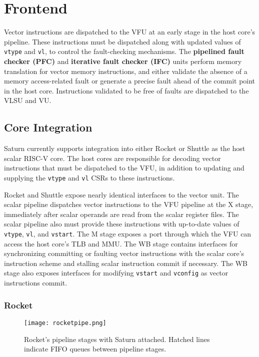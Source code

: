 \newpage
\section{Frontend}
\label{sec:frontend}


Vector instructions are dispatched to the VFU at an early stage in the host core's pipeline.
These instructions must be dispatched along with updated values of \texttt{vtype} and \texttt{vl}, to control the fault-checking mechanisms.
The \textbf{pipelined fault checker (PFC)} and \textbf{iterative fault checker (IFC)} units perform memory translation for vector memory instructions, and either validate the absence of a memory access-related fault or generate a precise fault ahead of the commit point in the host core.
Instructions validated to be free of faults are dispatched to the VLSU and VU.

\subsection{Core Integration}

Saturn currently supports integration into either Rocket or Shuttle as the host scalar RISC-V core.
The host cores are responsible for decoding vector instructions that must be dispatched to the VFU, in addition to updating and supplying the \texttt{vtype} and \texttt{vl} CSRs to these instructions.

Rocket and Shuttle expose nearly identical interfaces to the vector unit.
The scalar pipeline dispatches vector instructions to the VFU pipeline at the X stage, immediately after scalar operands are read from the scalar register files.
The scalar pipeline also must provide these instructions with up-to-date values of \texttt{vtype}, \texttt{vl}, and \texttt{vstart}.
The M stage exposes a port through which the VFU can access the host core's TLB and MMU.
The WB stage contains interfaces for synchronizing committing or faulting vector instructions with the scalar core's instruction scheme and stalling scalar instruction commit if necessary.
The WB stage also exposes interfaces for modifying \texttt{vstart} and \texttt{vconfig} as vector instructions commit.

\subsubsection{Rocket}

\begin{figure}[h]
  \centering
  \texttt{[image: rocketpipe.png]}
  \caption{Rocket's pipeline stages with Saturn attached. Hatched lines indicate FIFO queues between pipeline stages.}
  \label{fig:rocket}
\end{figure}

